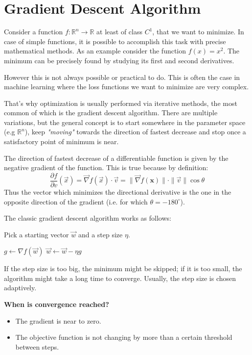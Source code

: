 \section{Gradient Descent Algorithm} \label{sec:gradient-descent}
Consider a function \( f : \mathbb{R}^{n} \to \mathbb{R} \) at least
of class \(C^{1}\), that we want to minimize.
In case of simple functions, it is possible to accomplish this task with precise mathematical methods.
As an example consider the function \( f(x) = x^{2} \).
The minimum can be precisely found by studying its first and second derivatives.

However this is not always possible or practical to do.
This is often the case in machine learning where the loss functions we want to minimize are very complex.

That's why optimization is usually performed via iterative methods, the most common of which is the gradient
descent algorithm.
There are multiple variations, but the general concept is to start somewhere in the parameter space (e.g
$\mathbb R^n$), keep \textit{"moving"} towards the direction of fastest decrease and stop once a satisfactory
point of minimum is near.

The direction of fastest decrease of a differentiable function is given by the negative gradient of the function.
This is true because by definition:
\[
  \frac{\partial f}{\partial v}(\vec x) = \vec \nabla f(\vec x) \cdot \vec v = \| \vec \nabla f(\boldsymbol
  x)\| \cdot \|\vec v\| \cos \theta
\]
Thus the vector which minimizes the directional derivative is the one in the opposite direction of the
gradient (i.e. for which $\theta = -180^{\circ}$).

The classic gradient descent algorithm works as follows:

\begin{algorithmic}[1]
  \State Pick a starting vector \( \vec{w} \) and a step size \( \eta \).

  \State \( g \gets \nabla f(\vec{w}) \)
  \State \( \vec{w} \gets \vec{w} - \eta g \)
  \EndWhile
\end{algorithmic}

If the step size is too big, the minimum might be skipped; if it is
too small, the algorithm might take a long time to converge.
Usually, the step size is chosen adaptively.

\textbf{When is convergence reached?}
\begin{itemize}
  \item The gradient is near to zero.
  \item The objective function is not changing by more than a certain
    threshold between steps.
\end{itemize}

